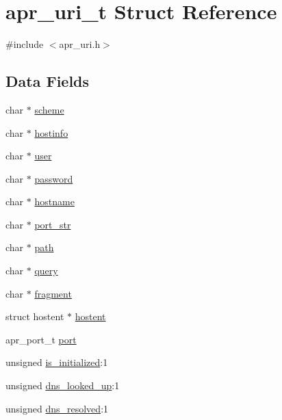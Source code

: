 \hypertarget{structapr__uri__t}{\section{apr\-\_\-uri\-\_\-t Struct Reference}
\label{structapr__uri__t}
}


{\ttfamily \#include $<$apr\-\_\-uri.\-h$>$}

\subsection*{Data Fields}
\begin{DoxyCompactItemize}
\item 
char $\ast$ \hyperlink{structapr__uri__t_a5d62fa370265b6bc956aa86d36024a5d}{scheme}
\item 
char $\ast$ \hyperlink{structapr__uri__t_a985b18875320d40cdb33d722ecf20ac2}{hostinfo}
\item 
char $\ast$ \hyperlink{structapr__uri__t_a2b763f50bec4fda0cf67e5238275b5fd}{user}
\item 
char $\ast$ \hyperlink{structapr__uri__t_a7eabf4f785f98a12762076f7519d3959}{password}
\item 
char $\ast$ \hyperlink{structapr__uri__t_a8c6bf3dfca3d159f091377d9f7228aec}{hostname}
\item 
char $\ast$ \hyperlink{structapr__uri__t_ad9d69051e1fb3f3709260c3c3c014012}{port\-\_\-str}
\item 
char $\ast$ \hyperlink{structapr__uri__t_a61cff1baadb3c1b52a34b502c25bba7f}{path}
\item 
char $\ast$ \hyperlink{structapr__uri__t_a88d889bcda9e95696022f04ffb470678}{query}
\item 
char $\ast$ \hyperlink{structapr__uri__t_a0e4abeaa1379c79dcc6fdac01d76715a}{fragment}
\item 
struct hostent $\ast$ \hyperlink{structapr__uri__t_a2ec4edaa7288f3c1ebcb8cbca3d0379c}{hostent}
\item 
apr\-\_\-port\-\_\-t \hyperlink{structapr__uri__t_a6e6e858ce56b5d58389287c1cc1134fa}{port}
\item 
unsigned \hyperlink{structapr__uri__t_a6f77dda6db6c31c2c3652f6026ea6b73}{is\-\_\-initialized}\-:1
\item 
unsigned \hyperlink{structapr__uri__t_ae28c03382cb6fcb226dfc76193699342}{dns\-\_\-looked\-\_\-up}\-:1
\item 
unsigned \hyperlink{structapr__uri__t_a805976fea6ef65f3ec1185c7d6dcf7f3}{dns\-\_\-resolved}\-:1
\end{DoxyCompactItemize}



